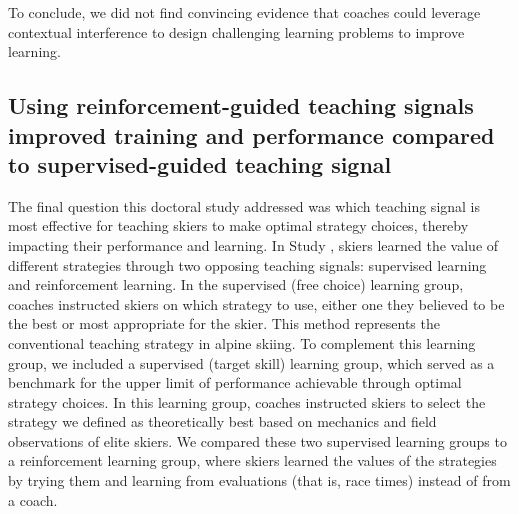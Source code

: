 To conclude, we did not find convincing evidence that coaches could leverage contextual interference to design challenging learning problems to improve learning.

\subsection{Using reinforcement-guided teaching signals improved training and performance compared to supervised-guided teaching signal}
The final question this doctoral study addressed was which teaching signal is most effective for teaching skiers to make optimal strategy choices, thereby impacting their performance and learning. In Study , skiers learned the value of different strategies through two opposing teaching signals: supervised learning and reinforcement learning. In the supervised (free choice) learning group, coaches instructed skiers on which strategy to use, either one they believed to be the best or most appropriate for the skier. This method represents the conventional teaching strategy in alpine skiing. To complement this learning group, we included a supervised (target skill) learning group, which served as a benchmark for the upper limit of performance achievable through optimal strategy choices. In this learning group, coaches instructed skiers to select the strategy we defined as theoretically best based on mechanics and field observations of elite skiers. We compared these two supervised learning groups to a reinforcement learning group, where skiers learned the values of the strategies by trying them and learning from evaluations (that is, race times) instead of from a coach. 






